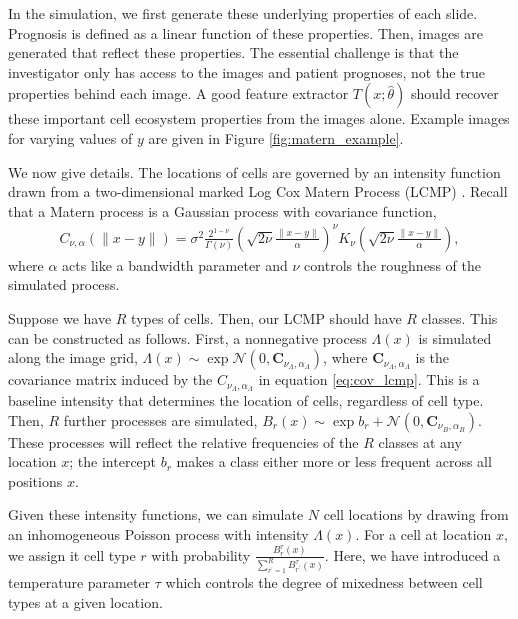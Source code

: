 In the simulation, we first generate these underlying properties of each slide.
Prognosis is defined as a linear function of these properties. Then, images are
generated that reflect these properties. The essential challenge is that the
investigator only has access to the images and patient prognoses, not the true
properties behind each image. A good feature extractor $T\left(x;
\hat{\theta}\right)$ should recover these important cell ecosystem properties
from the images alone. Example images for varying values of $y$ are given in
Figure \ref{fig:matern_example}.

We now give details. The locations of cells are governed by an intensity
function drawn from a two-dimensional marked Log Cox Matern Process (LCMP)
\cite{diggle2013spatial}. Recall that a Matern process is a Gaussian process
with covariance function,
\begin{align}
  \label{eq:cov_lcmp}
C_{\nu, \alpha}(\|x - y\|)=\sigma^{2} \frac{2^{1-\nu}}{\Gamma(\nu)}\left(\sqrt{2 \nu} \frac{\|x - y\|}{\alpha}\right)^{\nu} K_{\nu}\left(\sqrt{2 \nu} \frac{\|x - y\|}{\alpha}\right),
\end{align}
where $\alpha$ acts like a bandwidth parameter and $\nu$ controls the roughness
of the simulated process.

Suppose we have $R$ types of cells. Then, our LCMP should have $R$ classes. This
can be constructed as follows. First, a nonnegative process
$\Lambda\left(x\right)$ is simulated along the image grid,
$\Lambda\left(x\right) \sim \exp{\mathcal{N}\left(0, \mathbf{C}_{\nu_{\Lambda},
    \alpha_{\Lambda}}\right)}$, where $\mathbf{C}_{\nu_{\Lambda},
  \alpha_{\Lambda}}$ is the covariance matrix induced by the $C_{\nu_{\Lambda},
  \alpha_{\Lambda}}$ in equation \ref{eq:cov_lcmp}. This is a baseline intensity
that determines the location of cells, regardless of cell type. Then, $R$
further processes are simulated, $B_{r}\left(x\right) \sim \exp{b_{r} +
  \mathcal{N}\left(0, \mathbf{C}_{\nu_{B}, \alpha_{B}}\right)} $. These
processes will reflect the relative frequencies of the $R$ classes at any
location $x$; the intercept $b_r$ makes a class either more or less frequent
across all positions $x$.

Given these intensity functions, we can simulate $N$ cell locations by drawing
from an inhomogeneous Poisson process with intensity $\Lambda\left(x\right)$.
For a cell at location $x$, we assign it cell type $r$ with probability
$\frac{B_{r}^{\tau}\left(x\right)}{\sum_{r^\prime = 1}^{R}
  B^{\tau}_{r^\prime}\left(x\right)}$. Here, we have introduced a temperature
parameter $\tau$ which controls the degree of mixedness between cell types at a
given location.

